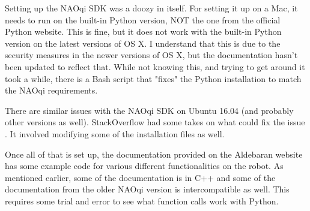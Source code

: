     Setting up the NAOqi SDK was a doozy in itself. For setting it up on a Mac, it needs to run on the built-in Python version,
    NOT the one from the official Python website. This is fine, but it does not work with the built-in Python version on the latest versions of OS X.
    I understand that this is due to the security measures in the newer versions of OS X, but the documentation hasn't been updated to reflect that.
    While not knowing this, and trying to get around it took a while, there is a Bash script \cite{BashScript}
    that "fixes" the Python installation to match the NAOqi requirements.

    There are similar issues with the NAOqi SDK on Ubuntu 16.04 (and probably other versions as well). StackOverflow had some takes
    on what could fix the issue \cite{naoUbuntu}. It involved modifying some of the installation files as well.

    Once all of that is set up, the documentation provided on the Aldebaran website \cite{AldebaranDoc} has some example code for various different functionalities on the robot.
    As mentioned earlier, some of the documentation is in C++ and some of the documentation from the older NAOqi version is intercompatible as well.
    This requires some trial and error to see what function calls work with Python.

